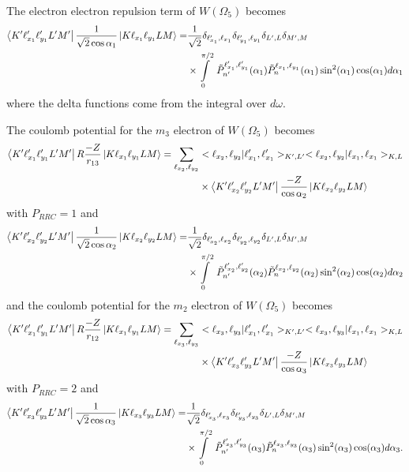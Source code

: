 The electron electron repulsion term of $W(\Omega_5)$ becomes
\begin{align}
    \bra{K'\ell_{x_1}'\ell_{y_1}'L'M'} \frac{1}{\sqrt{2}\cos\alpha_1} \ket{K \ell_{x_1} \ell_{y_1}LM} =& \frac{1}{\sqrt{2}} \delta_{\ell_{x_1}',\ell_{x_1}} \delta_{\ell_{y_1}',\ell_{y_1}} \delta_{L',L} \delta_{M',M} \\
    & \times \int\limits_0^{\pi/2}\ \tilde{P}^{\ell_{x_1}',\ell_{y_1}'}_{n'}(\alpha_1) \tilde{P}^{\ell_{x_1},\ell_{y_1}}_{n}(\alpha_1) \sin^2(\alpha_1) \cos(\alpha_1)d\alpha_1  
\end{align}
where the delta functions come from the integral over $d\omega$.

The coulomb potential for the $m_3$ electron of $W(\Omega_5)$ becomes
\begin{align}
    \bra{K'\ell_{x_1}'\ell_{y_1}'L'M'} R\frac{-Z}{r_{13}} \ket{K \ell_{x_1} \ell_{y_1}LM} = \sum_{\ell_{x_2},\ell_{y_2}}& <\ell_{x_2},\ell_{y_2}|\ell_{x_1}',\ell_{x_1}'>_{K',L'} <\ell_{x_2},\ell_{y_2}|\ell_{x_1},\ell_{x_1}>_{K,L} \\
    &\times \bra{K'\ell_{x_2}'\ell_{y_2}'L'M'} \frac{-Z}{\cos\alpha_2} \ket{K\ell_{x_2}\ell_{y_2}LM}
\end{align}
with $P_{RRC}=1$  and 
\begin{align}
    \bra{K'\ell_{x_2}'\ell_{y_2}'L'M'} \frac{1}{\sqrt{2}\cos\alpha_2} \ket{K \ell_{x_2} \ell_{y_2}LM} =& \frac{1}{\sqrt{2}} \delta_{\ell_{x_2}',\ell_{x_2}} \delta_{\ell_{y_2}',\ell_{y_2}} \delta_{L',L} \delta_{M',M} \\
    & \times \int\limits_0^{\pi/2}\ \tilde{P}^{\ell_{x_2}',\ell_{y_2}'}_{n'}(\alpha_2) \tilde{P}^{\ell_{x_2},\ell_{y_2}}_{n}(\alpha_2) \sin^2(\alpha_2) \cos(\alpha_2)d\alpha_2  
\end{align}
and the coulomb potential for the $m_2$ electron of $W(\Omega_5)$ becomes
\begin{align}
    \bra{K'\ell_{x_1}'\ell_{y_1}'L'M'} R\frac{-Z}{r_{12}} \ket{K \ell_{x_1} \ell_{y_1}LM} = \sum_{\ell_{x_3},\ell_{y_3}}& <\ell_{x_3},\ell_{y_3}|\ell_{x_1}',\ell_{x_1}'>_{K',L'} <\ell_{x_3},\ell_{y_3}|\ell_{x_1},\ell_{x_1}>_{K,L} \\
    &\times \bra{K'\ell_{x_3}'\ell_{y_3}'L'M'} \frac{-Z}{\cos\alpha_3} \ket{K\ell_{x_3}\ell_{y_3}LM}
\end{align}
with $P_{RRC}=2$  and 
\begin{align}
    \bra{K'\ell_{x_3}'\ell_{y_3}'L'M'} \frac{1}{\sqrt{2}\cos\alpha_3} \ket{K \ell_{x_3} \ell_{y_3}LM} =& \frac{1}{\sqrt{2}} \delta_{\ell_{x_3}',\ell_{x_3}} \delta_{\ell_{y_3}',\ell_{y_3}} \delta_{L',L} \delta_{M',M} \\
    & \times \int\limits_0^{\pi/2}\ \tilde{P}^{\ell_{x_3}',\ell_{y_3}'}_{n'}(\alpha_3) \tilde{P}^{\ell_{x_3},\ell_{y_3}}_{n}(\alpha_3) \sin^2(\alpha_3) \cos(\alpha_3)d\alpha_3.  
\end{align}

